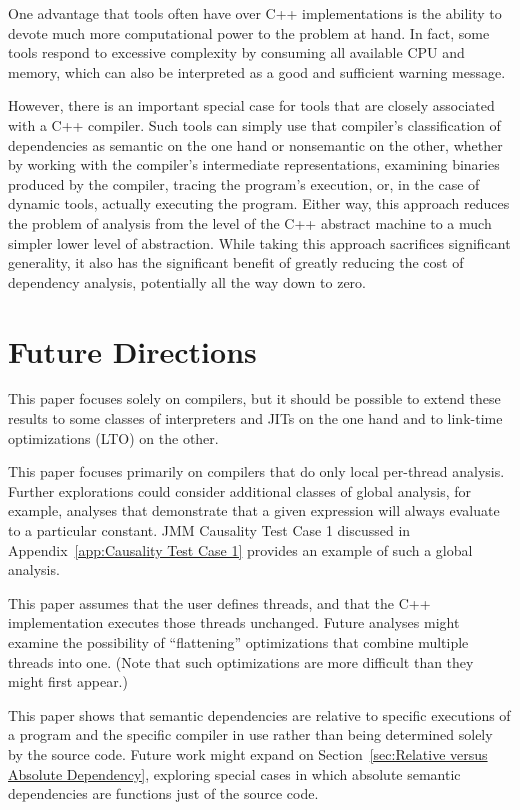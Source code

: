 \documentclass[10]{article}
\begin{document}
One advantage that tools often have over C++ implementations is the
ability to devote much more computational power to the problem at hand.
In fact, some tools respond to excessive complexity by consuming all
available CPU and memory, which can also be interpreted as a good and
sufficient warning message.

However, there is an important special case for tools that are closely
associated with a C++ compiler.
Such tools can simply use that compiler's classification of
dependencies as semantic on the one hand or nonsemantic on the
other, whether by working with the compiler's intermediate
representations, examining binaries produced by the compiler, tracing
the program's execution, or, in the case of dynamic tools, actually
executing the program.
Either way, this approach reduces the problem of analysis from the
level of the C++ abstract machine to a much simpler lower level of
abstraction.
While taking this approach sacrifices significant generality, it also
has the significant benefit of greatly reducing the cost of dependency
analysis, potentially all the way down to zero.

\section{Future Directions}
\label{sec:Future Directions}

This paper focuses solely on compilers, but it should be possible to
extend these results to some classes of interpreters and JITs on the
one hand and to link-time optimizations (LTO) on the other.

This paper focuses primarily on compilers that do only local per-thread
analysis.
Further explorations could consider additional classes of global analysis,
for example, analyses that demonstrate that a given expression will
always evaluate to a particular constant.
JMM Causality Test Case 1 discussed in
Appendix~\ref{app:Causality Test Case 1}
provides an example of such a global analysis.

This paper assumes that the user defines threads, and that the
C++ implementation executes those threads unchanged.
Future analyses might examine the possibility of ``flattening''
optimizations that combine multiple threads into one.
(Note that such optimizations are more difficult than they might first appear.)

This paper shows that semantic dependencies are relative to specific
executions of a program and the specific compiler in use rather than
being determined solely by the source code.
Future work might expand on
Section~\ref{sec:Relative versus Absolute Dependency},
exploring special cases in which absolute semantic dependencies are
functions just of the source code.
\end{document}
